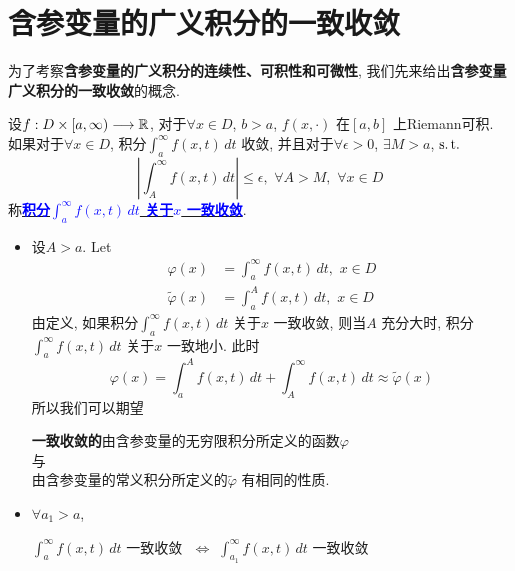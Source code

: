 \newpage

\section{含参变量的广义积分的一致收敛}
	为了考察\textbf{含参变量的广义积分的连续性、可积性和可微性}, 我们先来给出\textbf{含参变量广义积分的一致收敛}的概念.
	
	\begin{defn}\label{def A.3.1}
		设$f : D \times [a , \infty) \longrightarrow \mathbb{R}$, 对于$\forall x \in D$, $b > a$, $f(x , \cdot)$ 在$[a , b]$ 上Riemann可积. 如果对于$\forall x \in D$, 积分$\int_{a}^{\infty} f(x , t) \, dt$ 收敛, 并且对于$\forall \epsilon > 0$, $\exists M > a$, $\operatorname{s.t.}$
		\[ \left| \int_{A}^{\infty} f(x , t) \, dt \right| \leq \epsilon , \,\, \forall A > M , \,\, \forall x \in D \]
		称\underline{\textcolor{blue}{\textbf{积分$\int_{a}^\infty f(x , t) \, dt$ 关于$x$  一致收敛}}}. 
		
		\vspace{4em}
		
		\begin{rmk}
			\begin{itemize}
				\item 设$A > a$. Let
				\begin{align}
					\varphi(x) &= \int_{a}^{\infty} f(x , t) \, dt , \,\, x \in D \\
					\widetilde{\varphi}(x) &= \int_{a}^A f(x , t) \, dt , \,\, x \in D
				\end{align}
				由定义, 如果积分$\int_{a}^\infty f(x , t) \, dt$ 关于$x$ 一致收敛, 则当$A$ 充分大时, 积分$\int_{a}^{\infty} f(x , t) \, dt$ 关于$x$ 一致地小. 此时
				\[ \varphi(x) = \int_{a}^A f(x , t) \, dt + \int_{A}^{\infty} f(x , t) \, dt \approx \widetilde{\varphi}(x) \]
				所以我们可以期望
				\begin{center}
					\textbf{一致收敛的}由含参变量的无穷限积分所定义的函数$\varphi$ \\
					与 \\
					由含参变量的常义积分所定义的$\widetilde{\varphi}$ 有相同的性质.
				\end{center}
				
				\vspace{4em}
				
				\item $\forall a_1 > a$, 
				\begin{center}
					$\int_{a}^{\infty} f(x , t) \, dt$ 一致收敛 $\,\, \Leftrightarrow \,\, \int_{a_1}^{\infty} f(x , t) \, dt$ 一致收敛
				\end{center}
			\end{itemize}
		\end{rmk}
	\end{defn}


